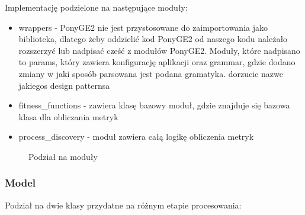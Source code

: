 Implementację podzielone na następujące moduły:
\begin{itemize}
    \item wrappers - PonyGE2 nie jest przystosowane do zaimportowania jako biblioteka, dlatego żeby oddzielić kod PonyGE2 od naszego kodu należało rozszerzyć lub nadpisać cześć z modułów PonyGE2. Moduły, które nadpisano to params, który zawiera konfigurację aplikacji oraz grammar, gdzie dodano zmiany w jaki sposób parsowana jest podana gramatyka. dorzucic nazwe jakiegos design patternsa
  \item fitness{\_}functions - zawiera klasę bazowy moduł, gdzie znajduje się bazowa klasa dla obliczania metryk
  \item process{\_}discovery - moduł zawiera całą logikę obliczenia metryk
\end{itemize}


\begin{figure}[!ht]
	\caption{\label{fig:flow_chart}Podział na moduły}
\end{figure}

\subsubsection{Model}

Podział na dwie klasy przydatne na różnym etapie procesowania:

